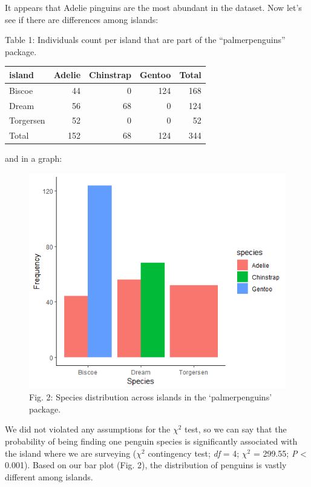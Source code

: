 \documentclass[
]{article}
\begin{document}
It appears that Adelie pinguins are the most abundant in the dataset.
Now let's see if there are differences among islands:

Table 1: Individuals count per island that are part of the
``palmerpenguins'' package.

\begin{longtable}[]{@{}lrrrr@{}}
\toprule\noalign{}
island & Adelie & Chinstrap & Gentoo & Total \\
\midrule\noalign{}
\endhead
\bottomrule\noalign{}
\endlastfoot
Biscoe & 44 & 0 & 124 & 168 \\
Dream & 56 & 68 & 0 & 124 \\
Torgersen & 52 & 0 & 0 & 52 \\
Total & 152 & 68 & 124 & 344 \\
\end{longtable}

and in a graph:

\begin{figure}
\centering
\includegraphics[width=5.29167in,height=\textheight]{images/island-penguin-02.png}
\caption{Fig. 2: Species distribution across islands in the
`palmerpenguins' package.}
\end{figure}

We did not violated any assumptions for the \(\chi^{2}\) test, so we can
say that the probability of being finding one penguin species is
significantly associated with the island where we are surveying
(\(\chi^{2}\) contingency test; \emph{df} = 4; \(\chi^{2}\) = 299.55;
\emph{P} \textless{} 0.001). Based on our bar plot (Fig. 2), the
distribution of penguins is vastly different among islands.
\end{document}

